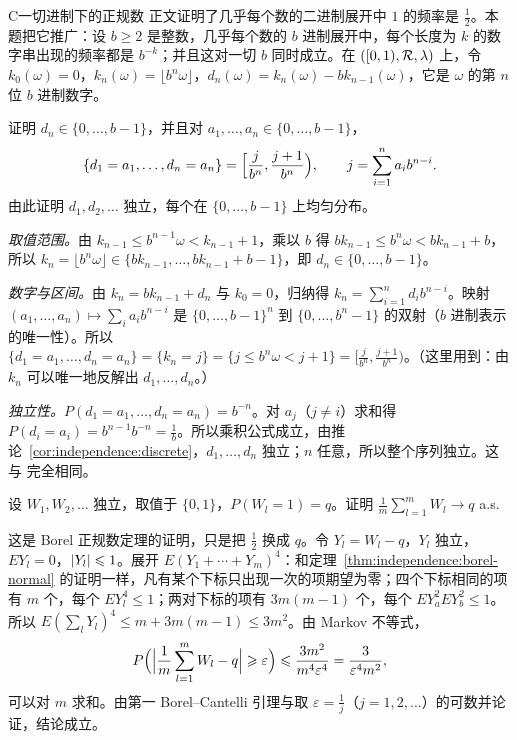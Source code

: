 \begin{probleme}{C}{一切进制下的正规数}
正文证明了几乎每个数的二进制展开中 $1$ 的频率是 $\frac12$。本题把它推广：设 $b\geqslant2$ 是整数，几乎每个数的 $b$ 进制展开中，每个长度为 $k$ 的数字串出现的频率都是 $b^{-k}$；并且这对一切 $b$ 同时成立。在 $([0,1),\mathcal{R},\lambda)$ 上，令 $k_0(\omega)=0$，$k_n(\omega)=\lfloor b^n\omega\rfloor$，$d_n(\omega)=k_n(\omega)-bk_{n-1}(\omega)$，它是 $\omega$ 的第 $n$ 位 $b$ 进制数字。
\begin{questions}
\item 证明 $d_n\in\{0,\dots,b-1\}$，并且对 $a_1,\dots,a_n\in\{0,\dots,b-1\}$，
\[
\{d_1=a_1,\dots,d_n=a_n\}=\Bigl[\frac j{b^n},\frac{j+1}{b^n}\Bigr),\qquad j=\sum_{i=1}^na_ib^{n-i}.
\]
由此证明 $d_1,d_2,\dots$ 独立，每个在 $\{0,\dots,b-1\}$ 上均匀分布。
\begin{solution}
\emph{取值范围。}由 $k_{n-1}\leqslant b^{n-1}\omega<k_{n-1}+1$，乘以 $b$ 得 $bk_{n-1}\leqslant b^n\omega<bk_{n-1}+b$，所以 $k_n=\lfloor b^n\omega\rfloor\in\{bk_{n-1},\dots,bk_{n-1}+b-1\}$，即 $d_n\in\{0,\dots,b-1\}$。

\emph{数字与区间。}由 $k_n=bk_{n-1}+d_n$ 与 $k_0=0$，归纳得 $k_n=\sum_{i=1}^nd_ib^{n-i}$。映射 $(a_1,\dots,a_n)\mapsto\sum_ia_ib^{n-i}$ 是 $\{0,\dots,b-1\}^n$ 到 $\{0,\dots,b^n-1\}$ 的双射（$b$ 进制表示的唯一性）。所以 $\{d_1=a_1,\dots,d_n=a_n\}=\{k_n=j\}=\{j\leqslant b^n\omega<j+1\}=[\frac j{b^n},\frac{j+1}{b^n})$。（这里用到：由 $k_n$ 可以唯一地反解出 $d_1,\dots,d_n$。）

\emph{独立性。}$P(d_1=a_1,\dots,d_n=a_n)=b^{-n}$。对 $a_j$（$j\neq i$）求和得 $P(d_i=a_i)=b^{n-1}b^{-n}=\frac1b$。所以乘积公式成立，由推论~\ref{cor:independence:discrete}，$d_1,\dots,d_n$ 独立；$n$ 任意，所以整个序列独立。这与 完全相同。
\end{solution}

\item 设 $W_1,W_2,\dots$ 独立，取值于 $\{0,1\}$，$P(W_l=1)=q$。证明 $\frac1m\sum_{l=1}^mW_l\to q$ a.s.
\begin{solution}
这是 Borel 正规数定理的证明，只是把 $\frac12$ 换成 $q$。令 $Y_l=W_l-q$，$Y_l$ 独立，$EY_l=0$，$\lvert Y_l\rvert\leqslant1$。展开 $E(Y_1+\cdots+Y_m)^4$：和定理~\ref{thm:independence:borel-normal} 的证明一样，凡有某个下标只出现一次的项期望为零；四个下标相同的项有 $m$ 个，每个 $EY_l^4\leqslant1$；两对下标的项有 $3m(m-1)$ 个，每个 $EY_a^2EY_b^2\leqslant1$。所以 $E(\sum_lY_l)^4\leqslant m+3m(m-1)\leqslant3m^2$。由 Markov 不等式，
\[
P\Bigl(\Bigl\lvert\frac1m\sum_{l=1}^mW_l-q\Bigr\rvert\geqslant\varepsilon\Bigr)\leqslant\frac{3m^2}{m^4\varepsilon^4}=\frac3{\varepsilon^4m^2},
\]
可以对 $m$ 求和。由第一 Borel--Cantelli 引理与取 $\varepsilon=\frac1j$（$j=1,2,\dots$）的可数并论证，结论成立。
\end{solution}


\end{questions}
\end{probleme}
